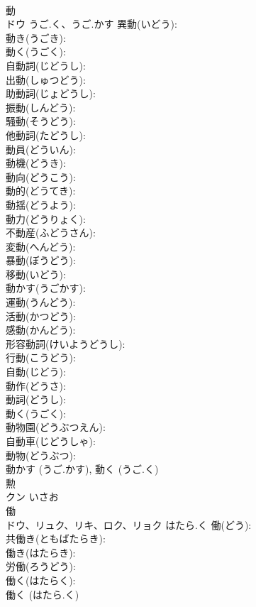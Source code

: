 \documentclass[8pt]{extreport}
\begin{document}
\begin{CJK}{UTF8}{min}
\\	動			
\\	ドウ	うご.く、うご.かす	異動(いどう): 
\\	動き(うごき): 
\\	動く(うごく): 
\\	自動詞(じどうし): 
\\	出動(しゅつどう): 
\\	助動詞(じょどうし): 
\\	振動(しんどう): 
\\	騒動(そうどう): 
\\	他動詞(たどうし): 
\\	動員(どういん): 
\\	動機(どうき): 
\\	動向(どうこう): 
\\	動的(どうてき): 
\\	動揺(どうよう): 
\\	動力(どうりょく): 
\\	不動産(ふどうさん): 
\\	変動(へんどう): 
\\	暴動(ぼうどう): 
\\	移動(いどう): 
\\	動かす(うごかす): 
\\	運動(うんどう): 
\\	活動(かつどう): 
\\	感動(かんどう): 
\\	形容動詞(けいようどうし): 
\\	行動(こうどう): 
\\	自動(じどう): 
\\	動作(どうさ): 
\\	動詞(どうし): 
\\	動く(うごく): 
\\	動物園(どうぶつえん): 
\\	自動車(じどうしゃ): 
\\	動物(どうぶつ): 
\\	動かす (うご.かす), 動く (うご.く)
\\	勲			
\\	クン	いさお		
\\	働			
\\	ドウ、リュク、リキ、ロク、リョク	はたら.く	働(どう): 
\\	共働き(ともばたらき): 
\\	働き(はたらき): 
\\	労働(ろうどう): 
\\	働く(はたらく): 
\\	働く (はたら.く)

\end{CJK}
\end{document}
